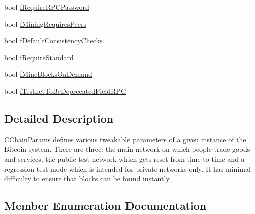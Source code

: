 \begin{DoxyCompactItemize}
bool \hyperlink{class_c_chain_params_af84ed151ace6ddc0cbfa649b1c263e9d}{f\+Require\+R\+P\+C\+Password}
\item 
bool \hyperlink{class_c_chain_params_abe9980263561e3f26b6352daa64092da}{f\+Mining\+Requires\+Peers}
\item 
bool \hyperlink{class_c_chain_params_a630f023ae4a95a8b420bad0a08b4428c}{f\+Default\+Consistency\+Checks}
\item 
bool \hyperlink{class_c_chain_params_abc615d2750d847e1eac0ecb7fc8d2da8}{f\+Require\+Standard}
\item 
bool \hyperlink{class_c_chain_params_ad640045ea40c569df7b826551872e1bd}{f\+Mine\+Blocks\+On\+Demand}
\item 
bool \hyperlink{class_c_chain_params_a4f62f1b7070f83b48aa86564628a2e7d}{f\+Testnet\+To\+Be\+Deprecated\+Field\+R\+P\+C}
\end{DoxyCompactItemize}


\subsection{Detailed Description}
\hyperlink{class_c_chain_params}{C\+Chain\+Params} defines various tweakable parameters of a given instance of the Bitcoin system. There are three\+: the main network on which people trade goods and services, the public test network which gets reset from time to time and a regression test mode which is intended for private networks only. It has minimal difficulty to ensure that blocks can be found instantly. 

\subsection{Member Enumeration Documentation}
\hypertarget{class_c_chain_params_aa294058ec2e3586bd8d03d6c39667058}{}
